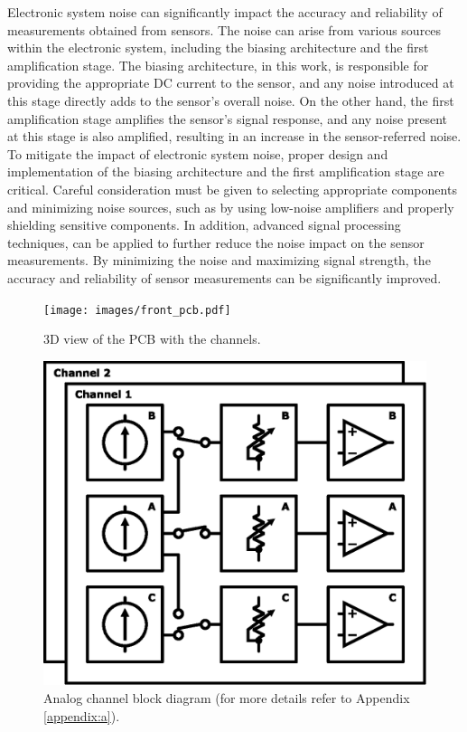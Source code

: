 Electronic system noise can significantly impact the accuracy and reliability of measurements obtained from sensors. The noise can arise from various sources within the electronic system, including the biasing architecture and the first amplification stage. The biasing architecture, in this work, is responsible for providing the appropriate \ac{DC} current to the sensor, and any noise introduced at this stage directly adds to the sensor's overall noise. On the other hand, the first amplification stage amplifies the sensor's signal response, and any noise present at this stage is also amplified, resulting in an increase in the sensor-referred noise. To mitigate the impact of electronic system noise, proper design and implementation of the biasing architecture and the first amplification stage are critical. Careful consideration must be given to selecting appropriate components and minimizing noise sources, such as by using low-noise amplifiers and properly shielding sensitive components. In addition, advanced signal processing techniques, can be applied to further reduce the noise impact on the sensor measurements. By minimizing the noise and maximizing signal strength, the accuracy and reliability of sensor measurements can be significantly improved.

\begin{figure}[!ht]
    \centering
    \begin{minipage}{0.45\textwidth}
        \centering
        \texttt{[image: images/front\_pcb.pdf]}
        \caption{3D view of the PCB with the channels.}
        \label{figure:channel-pcb}
    \end{minipage}\hfill
    \begin{minipage}{0.45\textwidth}
        \centering
        \includegraphics[width=\textwidth]{images/chapter_4/channel/channel_overview.eps}
        \caption{Analog channel block diagram (for more details refer to Appendix \ref{appendix:a}).}
        \label{figure:channel-bd}
    \end{minipage}
\end{figure}

